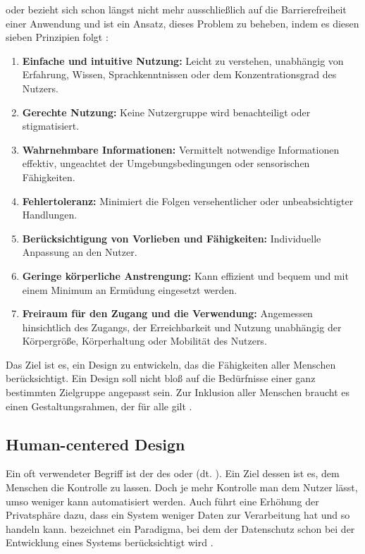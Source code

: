  oder  bezieht sich schon längst nicht mehr ausschließlich auf die Barrierefreiheit einer Anwendung und ist ein Ansatz, dieses Problem zu beheben, indem es diesen sieben Prinzipien folgt \cite{Kivirinta:2013:The-Right-UI-for-Elderly-People;}:

\begin{enumerate}%
	\item \textbf{Einfache und intuitive Nutzung:} Leicht zu verstehen, unabhängig von Erfahrung, Wissen, Sprachkenntnissen oder dem Konzentrationsgrad des Nutzers.
	\item \textbf{Gerechte Nutzung:} Keine Nutzergruppe wird benachteiligt oder stigmatisiert.
	\item \textbf{Wahrnehmbare Informationen:} Vermittelt notwendige Informationen effektiv, ungeachtet der Umgebungsbedingungen oder sensorischen Fähigkeiten.
	\item \textbf{Fehlertoleranz:} Minimiert die Folgen versehentlicher oder unbeabsichtigter Handlungen.
	\item \textbf{Berücksichtigung von Vorlieben und Fähigkeiten:} Individuelle Anpassung an den Nutzer.
	\item \textbf{Geringe körperliche Anstrengung:} Kann effizient und bequem und mit einem Minimum an Ermüdung eingesetzt werden.
	\item \textbf{Freiraum für den Zugang und die Verwendung:} Angemessen hinsichtlich des Zugangs, der Erreichbarkeit und Nutzung unabhängig der Körpergröße, Körperhaltung oder Mobilität des Nutzers.
\end{enumerate}

Das Ziel ist es, ein Design zu entwickeln, das die Fähigkeiten aller Menschen berücksichtigt. Ein Design soll nicht bloß auf die Bedürfnisse einer ganz bestimmten Zielgruppe angepasst sein. Zur Inklusion aller Menschen braucht es einen Gestaltungsrahmen, der für alle gilt \cite{Marcus:2003:Universal-Ubiquitous-User-Interface}\cite{Stephanidis:2001:User-interfaces-for-all:}. 

\subsection{Human-centered Design}

Ein oft verwendeter Begriff ist der des  oder  (dt. ). Ein Ziel dessen ist es, dem Menschen die Kontrolle zu lassen. Doch je mehr Kontrolle man dem Nutzer lässt, umso weniger kann automatisiert werden. Auch führt eine Erhöhung der Privatsphäre dazu, dass ein System weniger Daten zur Verarbeitung hat und so  handeln kann.  bezeichnet ein Paradigma, bei dem der Datenschutz schon bei der Entwicklung eines Systems berücksichtigt wird \cite{Stephanidis:2001:User-interfaces-for-all:}\cite{Streitz:2018:Beyond-smart-only-cities:}.

